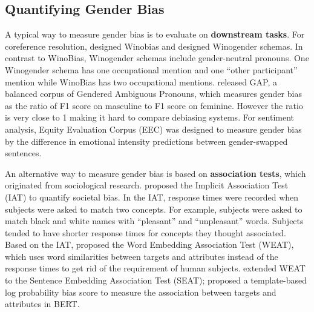 \subsection{Quantifying Gender Bias}
A typical way to measure gender bias is to evaluate on
\textbf{downstream tasks}. For coreference resolution,
\cite{zhao2018gender} designed Winobias and
\cite{rudinger2018gender} designed Winogender schemas. In
contrast to WinoBias, Winogender schemas include
gender-neutral pronouns. One Winogender schema has one
occupational mention and one ``other participant'' mention
while WinoBias has two occupational mentions. \cite{webster2018mind} released GAP, a
balanced corpus of Gendered Ambiguous Pronouns, which
measures gender bias as the ratio of F1 score on masculine
to F1 score on feminine. However the ratio is very close to 1  making it hard to compare debiasing systems. For sentiment analysis, Equity Evaluation Corpus (EEC)  was designed to measure gender bias by the difference in emotional intensity predictions between gender-swapped sentences.

An alternative way to measure gender bias is based on \textbf{association tests}, which originated from sociological research. \cite{greenwald1998measuring} proposed the Implicit Association Test (IAT) to quantify societal bias. In the IAT, response times were recorded when subjects were asked to match two concepts. For example, subjects were asked to match black and white names with ``pleasant'' and ``unpleasant'' words. Subjects tended to have shorter response times for concepts they thought associated. Based on the IAT, \cite{caliskan2017semantics} proposed the Word Embedding Association Test (WEAT), which uses word similarities between targets and attributes instead of the response times to get rid of the requirement of human subjects. \cite{may2019measuring} extended WEAT to the Sentence Embedding Association Test (SEAT); \cite{kurita2019measuring} proposed a template-based log probability bias score to measure the association between targets and attributes in BERT.




